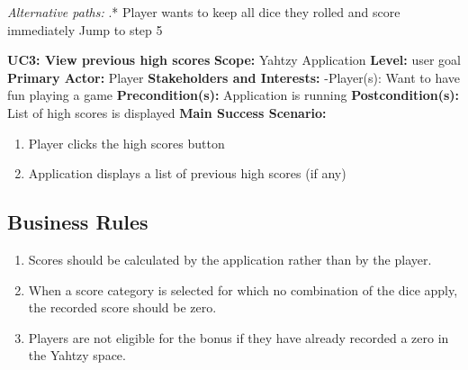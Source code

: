\documentclass[12pt]{article}
\begin{document}
\begin{list}{}{}
\textit{Alternative paths:} \newline
{}.* Player wants to keep all dice they rolled and score immediately \newline
{} Jump to step 5 \newline

\vspace*{.3in}
\item \textbf{UC3: View previous high scores} \newline
\textbf{Scope:} Yahtzy Application \newline
\textbf{Level:} user goal \newline
\textbf{Primary Actor:} Player \newline
\textbf{Stakeholders and Interests:} \newline
\indent -Player(s): Want to have fun playing a game \newline
\textbf{Precondition(s):} Application is running \newline
\textbf{Postcondition(s):} List of high scores is displayed \newline \newline
\textbf{Main Success Scenario:}
\begin{enumerate}
\item Player clicks the high scores button
\item Application displays a list of previous high scores (if any)
\end{enumerate}

\end{list}

\subsection*{Business Rules}
\begin{enumerate}
\item Scores should be calculated by the application rather than by the player.
\item When a score category is selected for which no combination of the dice apply, the recorded score should be zero.
\item Players are not eligible for the bonus if they have already recorded a zero in the Yahtzy space.
\end{enumerate}
\end{document}
